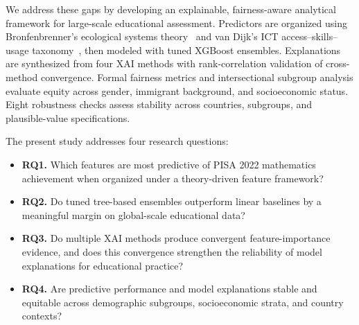 \documentclass[journal]{IEEEtran}
\begin{document}
We address these gaps by developing an explainable, fairness-aware analytical framework for large-scale educational assessment. Predictors are organized using Bronfenbrenner's ecological systems theory~\cite{Bronfenbrenner_1979,Bronfenbrenner_1994} and van Dijk's ICT access--skills--usage taxonomy~\cite{van_Dijk_2005,van_Dijk_2020}, then modeled with tuned XGBoost ensembles. Explanations are synthesized from four XAI methods with rank-correlation validation of cross-method convergence. Formal fairness metrics and intersectional subgroup analysis evaluate equity across gender, immigrant background, and socioeconomic status. Eight robustness checks assess stability across countries, subgroups, and plausible-value specifications.

The present study addresses four research questions:
\begin{itemize}
\item \textbf{RQ1.} Which features are most predictive of PISA 2022 mathematics achievement when organized under a theory-driven feature framework?
\item \textbf{RQ2.} Do tuned tree-based ensembles outperform linear baselines by a meaningful margin on global-scale educational data?
\item \textbf{RQ3.} Do multiple XAI methods produce convergent feature-importance evidence, and does this convergence strengthen the reliability of model explanations for educational practice?
\item \textbf{RQ4.} Are predictive performance and model explanations stable and equitable across demographic subgroups, socioeconomic strata, and country contexts?
\end{itemize}
\end{document}
